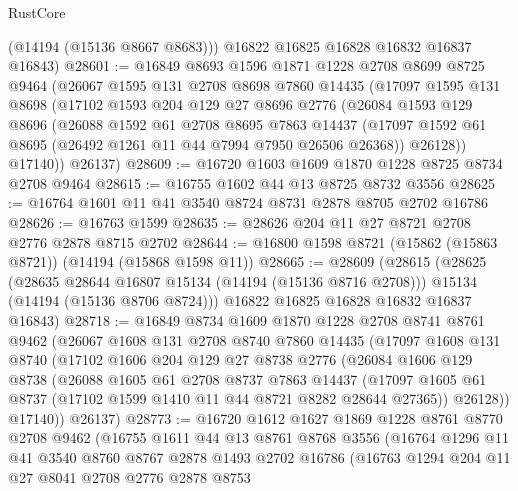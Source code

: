\begin{lexlean}{RustCore}
\begin{coremodule}
        (@14194 (@15136 @8667 @8683)))
      @16822
      @16825
      @16828
      @16832
      @16837
      @16843)
@28601 := @16849
    @8693
    @1596
    @1871
    @1228
    @2708
    @8699
    @8725
    @9464
    (@26067
      @1595
      @131
      @2708
      @8698
      @7860
      @14435
      (@17097
        @1595
        @131
        @8698
        (@17102
          @1593
          @204
          @129
          @27
          @8696
          @2776
          (@26084
            @1593
            @129
            @8696
            (@26088
              @1592
              @61
              @2708
              @8695
              @7863
              @14437
              (@17097 @1592 @61 @8695 (@26492 @1261 @11 @44 @7994 @7950 @26506 @26368))
              @26128))
          @17140))
      @26137)
@28609 := @16720 @1603 @1609 @1870 @1228 @8725 @8734 @2708 @9464
@28615 := @16755 @1602 @44 @13 @8725 @8732 @3556
@28625 := @16764 @1601 @11 @41 @3540 @8724 @8731 @2878 @8705 @2702 @16786
@28626 := @16763 @1599
@28635 := @28626 @204 @11 @27 @8721 @2708 @2776 @2878 @8715 @2702
@28644 := @16800 @1598 @8721 (@15862 (@15863 @8721)) (@14194 (@15868 @1598 @11))
@28665 := @28609
    (@28615
      (@28625
        (@28635 @28644 @16807 @15134 (@14194 (@15136 @8716 @2708)))
        @15134
        (@14194 (@15136 @8706 @8724)))
      @16822
      @16825
      @16828
      @16832
      @16837
      @16843)
@28718 := @16849
    @8734
    @1609
    @1870
    @1228
    @2708
    @8741
    @8761
    @9462
    (@26067
      @1608
      @131
      @2708
      @8740
      @7860
      @14435
      (@17097
        @1608
        @131
        @8740
        (@17102
          @1606
          @204
          @129
          @27
          @8738
          @2776
          (@26084
            @1606
            @129
            @8738
            (@26088
              @1605
              @61
              @2708
              @8737
              @7863
              @14437
              (@17097 @1605 @61 @8737 (@17102 @1599 @1410 @11 @44 @8721 @8282 @28644 @27365))
              @26128))
          @17140))
      @26137)
@28773 := @16720
    @1612
    @1627
    @1869
    @1228
    @8761
    @8770
    @2708
    @9462
    (@16755
      @1611
      @44
      @13
      @8761
      @8768
      @3556
      (@16764
        @1296
        @11
        @41
        @3540
        @8760
        @8767
        @2878
        @1493
        @2702
        @16786
        (@16763
          @1294
          @204
          @11
          @27
          @8041
          @2708
          @2776
          @2878
          @8753

\end{coremodule}
\end{lexlean}
